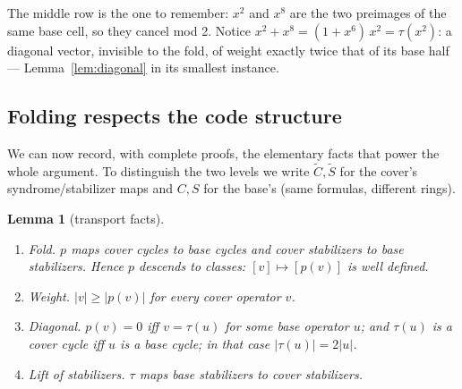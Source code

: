 \documentclass[11pt]{article}
\theoremstyle{plain}
\newtheorem{lemma}[theorem]{Lemma}
\theoremstyle{definition}
\theoremstyle{remark}
\newcommand{\wt}[1]{\lvert #1\rvert}
\begin{document}
The middle row is the one to remember: $x^2$ and $x^8$ are the two preimages
of the same base cell, so they cancel mod 2. Notice $x^2 + x^8 =
(1+x^6)\,x^2 = \tau(x^2)$: a diagonal vector, invisible to the fold, of weight
exactly twice that of its base half --- Lemma~\ref{lem:diagonal} in its
smallest instance.

\subsection{Folding respects the code structure}

We can now record, with complete proofs, the elementary facts that power the
whole argument. To distinguish the two levels we write $\widetilde C,
\widetilde S$ for the cover's syndrome/stabilizer maps and $C, S$ for the
base's (same formulas, different rings).

\begin{lemma}[transport facts]\label{lem:transport}
\leavevmode
\begin{enumerate}[label=\emph{(\arabic*)},leftmargin=2.4em]
\item \emph{Fold.} $p$ maps cover cycles to base cycles and cover stabilizers
  to base stabilizers. Hence $p$ descends to classes: $[v] \mapsto [p(v)]$ is
  well defined.
\item \emph{Weight.} $\wt{v} \geq \wt{p(v)}$ for every cover operator $v$.
\item \emph{Diagonal.} $p(v) = 0$ iff $v = \tau(u)$ for some base operator
  $u$; and $\tau(u)$ is a cover cycle iff $u$ is a base cycle; in that case
  $\wt{\tau(u)} = 2\wt{u}$.
\item \emph{Lift of stabilizers.} $\tau$ maps base stabilizers to cover
  stabilizers.
\end{enumerate}
\end{lemma}
\end{document}
